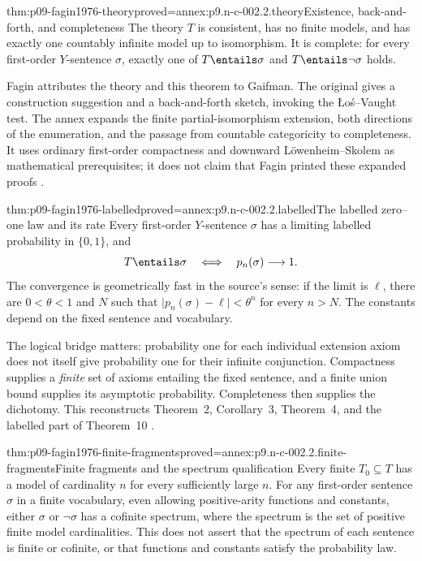 \begin{hbtheorem}{thm:p09-fagin1976-theory}{proved=annex:p9.n-c-002.2.theory}{Existence, back-and-forth, and completeness}
The theory \(T\) is consistent, has no finite models, and has exactly
one countably infinite model up to isomorphism.  It is complete: for every
first-order \(Y\)-sentence \(\sigma\), exactly one of
\(T\entails\sigma\) and \(T\entails\neg\sigma\) holds.
\end{hbtheorem}

Fagin attributes the theory and this theorem to Gaifman.  The original
gives a construction suggestion and a back-and-forth sketch, invoking the
\L o\'s--Vaught test.  The annex expands the finite partial-isomorphism
extension, both directions of the enumeration, and the passage from
countable categoricity to completeness.  It uses ordinary first-order
compactness and downward L\"owenheim--Skolem as mathematical prerequisites;
it does not claim that Fagin printed these expanded proofs
\cite[thm.~1, p.~51]{Fagin1976}.

\begin{hbtheorem}{thm:p09-fagin1976-labelled}{proved=annex:p9.n-c-002.2.labelled}{The labelled zero--one law and its rate}
Every first-order \(Y\)-sentence \(\sigma\) has a limiting labelled
probability in \(\{0,1\}\), and
\[
 T\entails\sigma\quad\Longleftrightarrow\quad p_n(\sigma)\longrightarrow1.
\]
The convergence is geometrically fast in the source's sense: if the
limit is \(\ell\), there are \(0<\theta<1\) and \(N\) such that
\(\lvert p_n(\sigma)-\ell\rvert<\theta^n\) for every \(n>N\).
The constants depend on the fixed sentence and vocabulary.
\end{hbtheorem}

The logical bridge matters: probability one for each individual extension
axiom does not itself give probability one for their infinite conjunction.
Compactness supplies a \emph{finite} set of axioms entailing the fixed
sentence, and a finite union bound supplies its asymptotic probability.
Completeness then supplies the dichotomy.  This reconstructs Theorem~2,
Corollary~3, Theorem~4, and the labelled part of Theorem~10
\cite[pp.~52--53 and 56]{Fagin1976}.

\begin{hbcorollary}{thm:p09-fagin1976-finite-fragments}{proved=annex:p9.n-c-002.2.finite-fragments}{Finite fragments and the spectrum qualification}
Every finite \(T_0\subseteq T\) has a model of cardinality \(n\) for
every sufficiently large \(n\).  For any first-order sentence \(\sigma\)
in a finite vocabulary, even allowing positive-arity functions and
constants, either \(\sigma\) or \(\neg\sigma\) has a cofinite spectrum,
where the spectrum is the set of positive finite model cardinalities.
This does not assert that the spectrum of each sentence is finite or
cofinite, or that functions and constants satisfy the probability law.
\end{hbcorollary}


